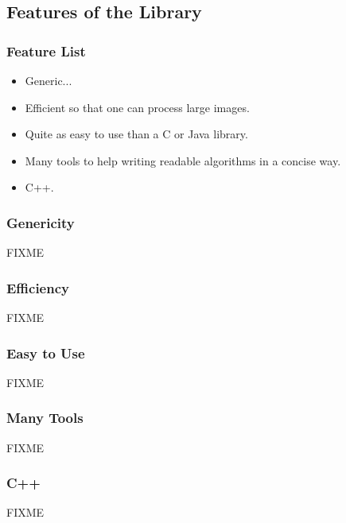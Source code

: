 \documentclass{beamer}
\begin{document}
\subsection{Features of the \mln Library}

\begin{frame}
  \frametitle{Feature List}

  \begin{itemize}
  \item Generic...
  \item Efficient so that one can process large images.
  \item Quite as easy to use than a C or Java library.
  \item Many tools to help writing readable algorithms in a concise way.
  \item C++.
  \end{itemize}

\end{frame}


\begin{frame}
  \frametitle{Genericity}

  FIXME

\end{frame}


\begin{frame}
  \frametitle{Efficiency}

  FIXME

\end{frame}


\begin{frame}
  \frametitle{Easy to Use}

  FIXME

\end{frame}


\begin{frame}
  \frametitle{Many Tools}

  FIXME

\end{frame}


\begin{frame}
  \frametitle{C++}

  FIXME

\end{frame}
\end{document}
